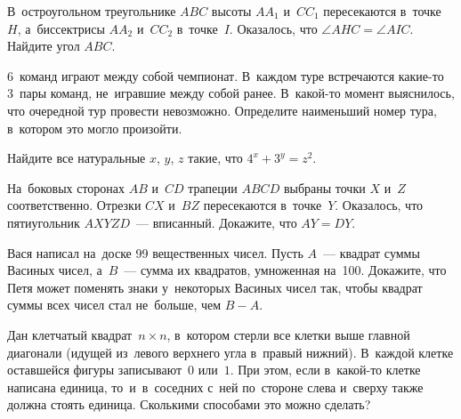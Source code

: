 


\begin{problems}

\item
В~остроугольном треугольнике $ABC$ высоты $A A_1$ и~$C C_1$ пересекаются
в~точке~$H$, а~биссектрисы $A A_2$ и~$C C_2$ в~точке~$I$.
Оказалось, что $\angle AHC = \angle AIC$.
Найдите угол $ABC$.

\item
6~команд играют между собой чемпионат.
В~каждом туре встречаются какие-то 3~пары команд, не~игравшие между собой
ранее.
В~какой-то момент выяснилось, что очередной тур провести невозможно.
Определите наименьший номер тура, в~котором это могло произойти.

\item
Найдите все натуральные $x$, $y$, $z$ такие, что $4^{x} + 3^{y} = z^{2}$.

\item
На~боковых сторонах $AB$ и~$CD$ трапеции $ABCD$ выбраны точки $X$ и~$Z$
соответственно.
Отрезки $CX$ и~$BZ$ пересекаются в~точке~$Y$.
Оказалось, что пятиугольник $AXYZD$~--- вписанный.
Докажите, что $AY = DY$.

\item
Вася написал на~доске 99 вещественных чисел.
Пусть $A$~--- квадрат суммы Васиных чисел, а~$B$~--- сумма их квадратов,
умноженная на~100.
Докажите, что Петя может поменять знаки у~некоторых Васиных чисел так, чтобы
квадрат суммы всех чисел стал не~больше, чем $B - A$.

\item
Дан клетчатый квадрат~$n \times n$, в~котором стерли все клетки выше главной
диагонали (идущей из~левого верхнего угла в~правый нижний).
В~каждой клетке оставшейся фигуры записывают~$0$ или~$1$.
При этом, если в~какой-то клетке написана единица, то~и~в~соседних с~ней
по~стороне слева и~сверху также должна стоять единица.
Сколькими способами это можно сделать?

\end{problems}

